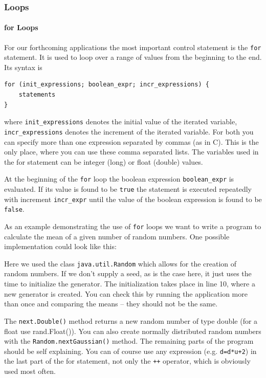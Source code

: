 \subsubsection{Loops}
\paragraph{for Loops}
For our forthcoming applications the most important control statement
is the \verb|for| statement. It is used to loop over a range of values
from the beginning to the end. Its syntax is
\begin{verbatim}
for (init_expressions; boolean_expr; incr_expressions) {
    statements
}
\end{verbatim}
where \verb|init_expressions| denotes the initial value of the iterated
variable, \verb|incr_expressions| denotes the increment of the iterated
variable. For both you can specify more than one expression separated
by commas (as in C). This is the only place, where you can use these comma
separated lists. The variables used in the for statement can be 
integer (long) or float (double) values. 

At the beginning of the \verb|for| loop the boolean expression
\verb|boolean_expr| is evaluated. If its value is found to be 
\verb|true| the statement is executed repeatedly with increment
\verb|incr_expr| until the value of the boolean expression is found to
be \verb|false|.

As an example demonstrating the use of
\verb|for| loops we want to write a program to calculate the mean of
a given number of random numbers. One possible implementation
could look like this:

Here we used the class \verb|java.util.Random| which allows for
the creation of random numbers. If we don't supply a seed, as is the
case here, it just uses the time to initialize the generator. The
initialization takes place in line 10, where a new generator is created.
You can check this by running the application more than once and comparing
the means -- they should not be the same. 

The \verb|next.Double()| method returns a new random number of type
double (for a float use rand.Float()). You can also create normally 
distributed random numbers with the \verb|Random.nextGaussian()| method.
The remaining parts of the program should be self explaining. You can of
course use any expression (e.g. \verb|d=d*u+2|) 
in the last part of the for statement, not only
the \verb|++| operator, which is obviously used most often. 

